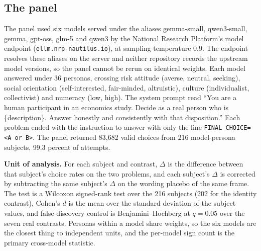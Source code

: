 \documentclass[journal]{IEEEtran}
\begin{document}
\subsection{The panel}
The panel used six models served under the aliases gemma-small, qwen3-small, gemma, gpt-oss, glm-5 and qwen3 by the National Research Platform's model endpoint (\texttt{ellm.nrp-nautilus.io}), at sampling temperature 0.9.
The endpoint resolves these aliases on the server and neither repository records the upstream model versions, so the panel cannot be rerun on identical weights.
Each model answered under 36 personas, crossing risk attitude (averse, neutral, seeking), social orientation (self-interested, fair-minded, altruistic), culture (individualist, collectivist) and numeracy (low, high).
The system prompt read ``You are a human participant in an economics study. Decide as a real person who is \{description\}. Answer honestly and consistently with that disposition.''
Each problem ended with the instruction to answer with only the line \texttt{FINAL CHOICE=<A or B>}.
The panel returned 83{,}682 valid choices from 216 model-persona subjects, 99.3 percent of attempts.

\textbf{Unit of analysis.}
For each subject and contrast, $\Delta$ is the difference between that subject's choice rates on the two problems, and each subject's $\Delta$ is corrected by subtracting the same subject's $\Delta$ on the wording placebo of the same frame.
The test is a Wilcoxon signed-rank test over the 216 subjects (202 for the identity contrast), Cohen's $d$ is the mean over the standard deviation of the subject values, and false-discovery control is Benjamini--Hochberg at $q=0.05$ over the seven real contrasts.
Personas within a model share weights, so the six models are the closest thing to independent units, and the per-model sign count is the primary cross-model statistic.
\end{document}
